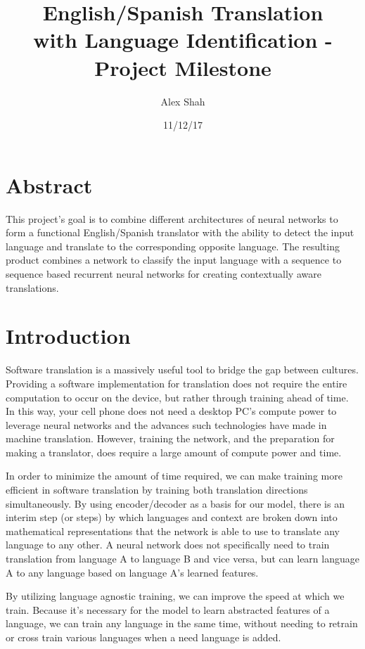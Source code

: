 \documentclass[10pt,a4paper]{article}
\begin{document}
\title{English/Spanish Translation \\ with Language Identification - \\ Project Milestone}
\author{Alex Shah}
\date{11/12/17}

\maketitle

\section{Abstract}

   This project's goal is to combine different architectures of neural networks to form a functional English/Spanish translator with the ability to detect the input language and translate to the corresponding opposite language. The resulting product combines a network to classify the input language with a sequence to sequence based recurrent neural networks for creating contextually aware translations.

\section{Introduction}
  Software translation is a massively useful tool to bridge the gap between cultures. Providing a software implementation for translation does not require the entire computation to occur on the device, but rather through training ahead of time. In this way, your cell phone does not need a desktop PC's compute power to leverage neural networks and the advances such technologies have made in machine translation. However, training the network, and the preparation for making a translator, does require a large amount of compute power and time.

  In order to minimize the amount of time required, we can make training more efficient in software translation by training both translation directions simultaneously. By using encoder/decoder as a basis for our model, there is an interim step (or steps) by which languages and context are broken down into mathematical representations that the network is able to use to translate any language to any other. A neural network does not specifically need to train translation from language A to language B and vice versa, but can learn language A to any language based on language A's learned features. 

  By utilizing language agnostic training, we can improve the speed at which we train. Because it's necessary for the model to learn abstracted features of a language, we can train any language in the same time, without needing to retrain or cross train various languages when a need language is added.
\end{document}
